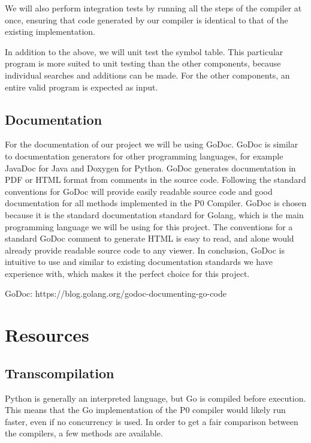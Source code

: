 \documentclass{article}
\begin{document}
We will also perform integration tests by running all the steps of the compiler
at once, ensuring that code generated by our compiler is identical to that of
the existing implementation.

In addition to the above, we will unit test the symbol table.
This particular program is more suited to unit testing than the other components,
because individual searches and additions can be made.
For the other components, an entire valid program is expected as input.

\subsection{Documentation} %

For the documentation of our project we will be using GoDoc. GoDoc is similar to documentation 
generators for other programming languages, for example JavaDoc for Java and Doxygen for Python. 
GoDoc generates documentation in PDF or HTML format from comments in the source code. 
Following the standard conventions for GoDoc will provide easily readable source code and good 
documentation for all methods implemented in the P0 Compiler. GoDoc is chosen because it is the standard documentation standard for Golang, 
which is the main programming language we will be using for this project. The conventions for a standard GoDoc comment to generate HTML
 is easy to read, and alone would already provide readable source code to any viewer. 
 In conclusion, GoDoc is intuitive to use and similar to existing documentation standards we have experience with, 
 which makes it the perfect choice for this project.
 
GoDoc: https://blog.golang.org/godoc-documenting-go-code

\section{Resources}

\subsection{Transcompilation} %

Python is generally an interpreted language, but Go is compiled before execution.
This means that the Go implementation of the P0 compiler would likely run
faster, even if no concurrency is used.
In order to get a fair comparison between the compilers, a few methods are
available.
\end{document}
